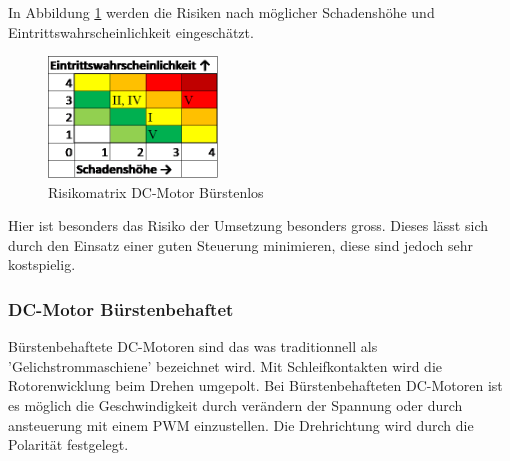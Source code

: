 \documentclass[../../main.tex]{subfiles}
\begin{document}
    In Abbildung \ref{fig:antr_risikomatrix_buerstenlos} werden die Risiken nach möglicher Schadenshöhe und Eintrittswahrscheinlichkeit eingeschätzt.

    \begin{figure}[H]
        \centering
        \includegraphics[width=0.4\textwidth]{Antr_Risiko_DCMotor_Buerstenlos.png}
        \caption {Risikomatrix DC-Motor Bürstenlos}
        \label{fig:antr_risikomatrix_buerstenlos}
    \end{figure}

    Hier ist besonders das Risiko der Umsetzung besonders gross. Dieses lässt sich durch den Einsatz einer guten Steuerung minimieren, diese sind jedoch sehr kostspielig.

    \subsubsection{DC-Motor Bürstenbehaftet}
    
    Bürstenbehaftete DC-Motoren sind das was traditionnell als 'Gelichstrommaschiene' bezeichnet wird. Mit Schleifkontakten wird die Rotorenwicklung beim Drehen umgepolt.
    Bei Bürstenbehafteten DC-Motoren ist es möglich die Geschwindigkeit durch verändern der Spannung oder durch ansteuerung mit einem PWM einzustellen. Die Drehrichtung wird durch die Polarität festgelegt.
\end{document}
